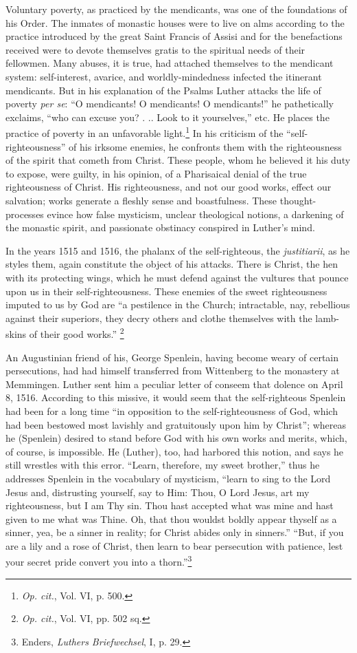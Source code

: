 Voluntary poverty, as practiced by the mendicants, was one of the
foundations of his Order. The inmates of monastic houses were to
live on alms according to the practice introduced by the great Saint
Francis of Assisi and for the benefactions received were to devote
themselves gratis to the spiritual needs of their fellowmen. Many
abuses, it is true, had attached themselves to the mendicant system:
self-interest, avarice, and worldly-mindedness infected the itinerant
mendicants. But in his explanation of the Psalms Luther attacks the
life of poverty \textit{per se}: “O mendicants! O mendicants! O mendicants!”
he pathetically exclaims, “who can excuse you? . .. Look to it
yourselves,” etc. He places the practice of poverty in an unfavorable
light.\footnote{\textit{Op. cit.}, Vol. VI, p. 500.}
In his criticism of the “self-righteousness” of his irksome
enemies, he confronts them with the righteousness of the spirit that
cometh from Christ. These people, whom he believed it his duty to
expose, were guilty, in his opinion, of a Pharisaical denial of the true
righteousness of Christ. His righteousness, and not our good works,
effect our salvation; works generate a fleshly sense and boastfulness.
These thought-processes evince how false mysticism, unclear theological
notions, a darkening of the monastic spirit, and passionate
obstinacy conspired in Luther’s mind.

In the years 1515 and 1516, the phalanx of the self-righteous, the \textit{justitiarii},
as he styles them, again constitute the object of his attacks. There
is Christ, the hen with its protecting wings, which he must defend against
the vultures that pounce upon us in their self-righteousness. These enemies
of the sweet righteousness imputed to us by God are “a pestilence in the
Church; intractable, nay, rebellious against their superiors, they decry others
and clothe themselves with the lamb-skins of their good works.”
\footnote{\textit{Op. cit.}, Vol. VI, pp. 502 sq.}

An Augustinian friend of his, George Spenlein, having become weary
of certain persecutions, had had himself transferred from Wittenberg to
the monastery at Memmingen. Luther sent him a peculiar letter of conseem that
dolence on April 8, 1516. According to this missive, it would seem that
the self-righteous Spenlein had been for a long time ``in opposition to the
self-righteousness of God, which had been bestowed most lavishly and
gratuitously upon him by Christ''; whereas he (Spenlein) desired to stand
before God with his own works and merits, which, of course, is impossible.
He (Luther), too, had harbored this notion, and says he still wrestles with
this error. “Learn, therefore, my sweet brother,” thus he addresses Spenlein
in the vocabulary of mysticism, “learn to sing to the Lord Jesus and, distrusting
yourself, say to Him: Thou, O Lord Jesus, art my righteousness, but
I am Thy sin. Thou hast accepted what was mine and hast given to me what
was Thine. Oh, that thou wouldst boldly appear thyself as a sinner, yea,
be a sinner in reality; for Christ abides only in sinners.” “But, if you are
a lily and a rose of Christ, then learn to bear persecution with patience,
lest your secret pride convert you into a thorn.”\footnote
{Enders, \textit{Luthers Briefwechsel}, I, p. 29.}

